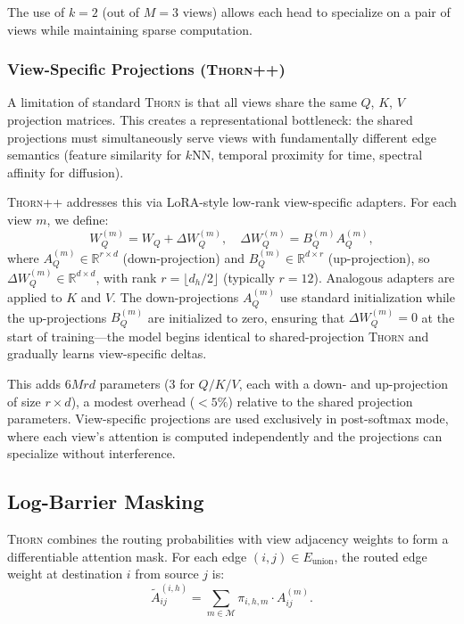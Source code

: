 \documentclass[11pt,a4paper]{article}
\newcommand{\thorn}{\textsc{Thorn}}
\newcommand{\thornpp}{\textsc{Thorn++}}
\newcommand{\RR}{\mathbb{R}}
\newcommand{\calM}{\mathcal{M}}
\begin{document}
The use of $k = 2$ (out of $M = 3$ views) allows each head to
specialize on a pair of views while maintaining sparse computation.

\subsubsection{View-Specific Projections (\thornpp{})}
\label{sec:view_projections}

A limitation of standard \thorn{} is that all views share the same
$Q$, $K$, $V$ projection matrices.
This creates a representational bottleneck: the shared projections must
simultaneously serve views with fundamentally different edge semantics
(feature similarity for $k$NN, temporal proximity for time, spectral
affinity for diffusion).

\thornpp{} addresses this via LoRA-style \citep{hu2020lora} low-rank
view-specific adapters.
For each view $m$, we define:
\begin{equation}
  \label{eq:lora_qkv}
  W_Q^{(m)} = W_Q + \Delta W_Q^{(m)}, \quad
  \Delta W_Q^{(m)} = B_Q^{(m)} A_Q^{(m)},
\end{equation}
where $A_Q^{(m)} \in \RR^{r \times d}$ (down-projection) and
$B_Q^{(m)} \in \RR^{d \times r}$ (up-projection), so
$\Delta W_Q^{(m)} \in \RR^{d \times d}$, with rank
$r = \lfloor d_h / 2 \rfloor$ (typically $r = 12$).
Analogous adapters are applied to $K$ and $V$.
The down-projections $A_Q^{(m)}$ use standard initialization while the
up-projections $B_Q^{(m)}$ are initialized to zero, ensuring that
$\Delta W_Q^{(m)} = 0$ at the start of training---the model begins
identical to shared-projection \thorn{} and gradually learns
view-specific deltas.

This adds $6Mrd$ parameters (3 for $Q/K/V$, each with a down- and
up-projection of size $r \times d$), a modest overhead ($< 5\%$)
relative to the shared projection parameters.
View-specific projections are used exclusively in post-softmax mode,
where each view's attention is computed independently and the projections
can specialize without interference.

\subsection{Log-Barrier Masking}
\label{sec:logbarrier}

\thorn{} combines the routing probabilities with view adjacency weights
to form a differentiable attention mask.
For each edge $(i, j) \in E_{\mathrm{union}}$, the routed edge weight
at destination $i$ from source $j$ is:
\begin{equation}
  \label{eq:routedA}
  \tilde{A}_{ij}^{(i,h)} = \sum_{m \in \calM}
    \pi_{i,h,m} \cdot A_{ij}^{(m)}.
\end{equation}
\end{document}
